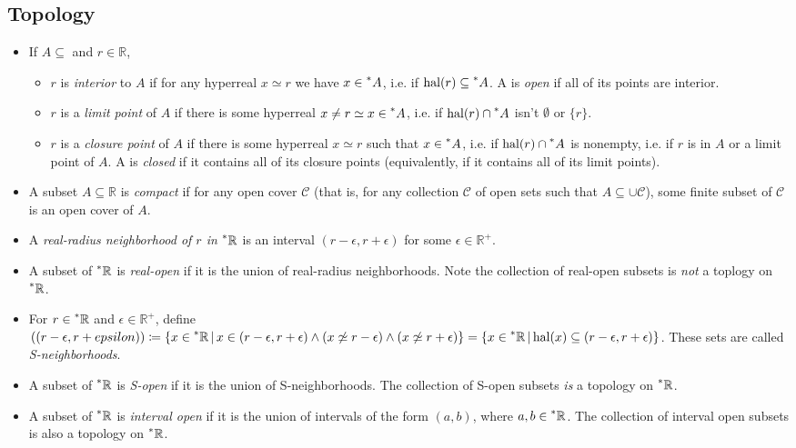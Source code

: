 \documentclass{article}
\newcommand{\hal}[1]{\mathrm{hal}(#1)}
\newcommand{\reals}{\mathbb{R}}
\newcommand{\hreals}{\prescript{*}{}{\mathbb{R}}}
\newcommand{\hr}[1]{\prescript{*}{}{#1}}
\begin{document}
\subsection*{Topology}
\begin{itemize}
    \item If $A \subseteq$ and $r \in \reals$,
    \begin{itemize}
        \item $r$ is \textit{interior} to $A$ if for any hyperreal $x \simeq r$ we have $x \in \hr{A}$, i.e. if $\hal{r} \subseteq \hr{A}$. A is \textit{open} if all of its points are interior.
        \item $r$ is a \textit{limit point} of $A$ if there is some hyperreal $x \neq r \simeq x \in \hr{A}$, i.e. if $\hal{r} \cap \hr{A}$ isn't $\emptyset$ or $\{r\}$.
        \item $r$ is a \textit{closure point} of $A$ if there is some hyperreal $x \simeq r$ such that $x \in \hr{A}$, i.e. if $\hal{r} \cap \hr{A}$ is nonempty, i.e. if $r$ is in $A$ or a limit point of $A$. A is \textit{closed} if it  contains all of its closure points (equivalently, if it contains all of its limit points).
    \end{itemize}
    \item A subset $A \subseteq \reals$ is \textit{compact} if for any open cover $\mathcal{C}$ (that is, for any collection $\mathcal{C}$ of open sets such that $A \subseteq \cup \mathcal{C}$), some finite subset of $\mathcal{C}$ is an open cover of $A$.
    \item A \textit{real-radius neighborhood of $r$ in $\hreals$} is an interval $(r - \epsilon, r + \epsilon)$ for some $\epsilon \in \reals^+$.
    \item A subset of $\hreals$ is \textit{real-open} if it is the union of real-radius neighborhoods. Note the collection of real-open subsets is \textit{not} a toplogy on $\hreals$.
    \item For $r \in \hreals$ and $\epsilon \in \reals^+$, define $((r - \epsilon, r + epsilon)) \coloneq \{x \in \hreals \,|\, x \in (r-\epsilon, r+\epsilon) \land (x \not\simeq r-\epsilon) \land (x\not\simeq r+\epsilon)\} = \{x \in \hreals \,|\, \hal{x} \subseteq (r-\epsilon, r+\epsilon)\}$. These sets are called \textit{S-neighborhoods}.
    \item A subset of $\hreals$ is \textit{S-open} if it is the union of S-neighborhoods. The collection of S-open subsets \textit{is} a topology on $\hreals$.
    \item A subset of $\hreals$ is \textit{interval open} if it is the union of intervals of the form $(a, b)$, where $a, b \in \hreals$. The collection of interval open subsets is also a topology on $\hreals$.
\end{itemize}
\end{document}
